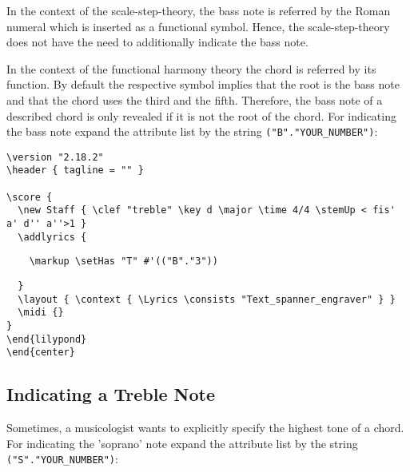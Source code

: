 \documentclass[
  DIV=calc,
  BCOR=5mm,
  12pt,
  headings=small,
  oneside,
  abstract=true,
  toc=bib,
  xcolor=dvipsnames,
  openany,
  ngerman,english]{scrartcl}
\begin{document}
In the context of the scale-step-theory, the bass note is referred by the Roman
numeral which is inserted as a functional symbol. Hence, the  scale-step-theory
does not have the need to additionally indicate the bass note.

In the context of the functional harmony theory the chord is referred by its
function. By default the respective symbol implies that the root is the bass
note and that the chord uses the third and the fifth. Therefore, the bass note
of a described chord is only revealed if it is not the root of the chord. For
indicating the bass note expand the attribute list by the
string \texttt{("B"."YOUR\_NUMBER")}:

\begin{center}
\end{center}

\begin{scriptsize}
\begin{verbatim}
\version "2.18.2"
\header { tagline = "" }

\score {
  \new Staff { \clef "treble" \key d \major \time 4/4 \stemUp < fis' a' d'' a''>1 }
  \addlyrics { 
\end{verbatim}
{ \color{red} \verb|    \markup \setHas "T" #'(("B"."3"))| }
\begin{verbatim}    
  }
  \layout { \context { \Lyrics \consists "Text_spanner_engraver" } }
  \midi {}
}
\end{lilypond}
\end{center}
\end{verbatim}
\end{scriptsize}

\subsection{Indicating a Treble Note}

Sometimes, a musicologist wants to explicitly specify the highest tone of a
chord. For indicating the 'soprano' note expand the attribute list by the string
\texttt{("S"."YOUR\_NUMBER")}:
\begin{center}
\end{center}
\end{document}
